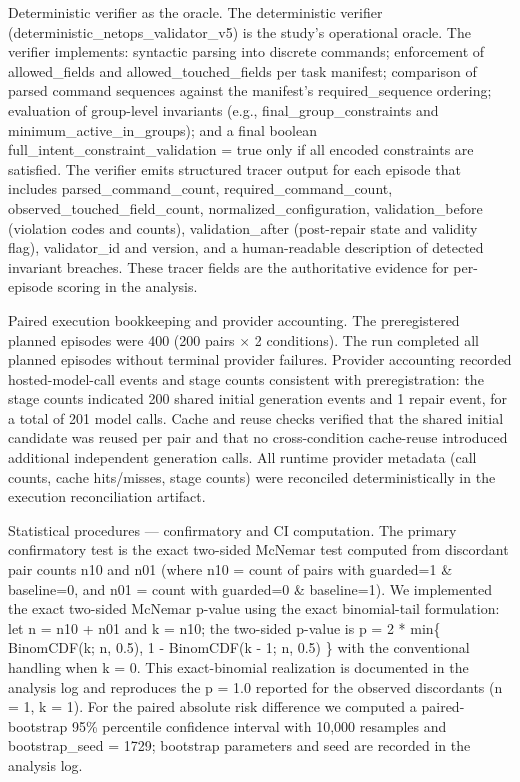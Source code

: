\documentclass[conference]{IEEEtran}
\begin{document}
Deterministic verifier as the oracle. The deterministic verifier (deterministic\_netops\_validator\_v5) is the study's operational oracle. The verifier implements: syntactic parsing into discrete commands; enforcement of allowed\_fields and allowed\_touched\_fields per task manifest; comparison of parsed command sequences against the manifest's required\_sequence ordering; evaluation of group-level invariants (e.g., final\_group\_constraints and minimum\_active\_in\_groups); and a final boolean full\_intent\_constraint\_validation = true only if all encoded constraints are satisfied. The verifier emits structured tracer output for each episode that includes parsed\_command\_count, required\_command\_count, observed\_touched\_field\_count, normalized\_configuration, validation\_before (violation codes and counts), validation\_after (post-repair state and validity flag), validator\_id and version, and a human-readable description of detected invariant breaches. These tracer fields are the authoritative evidence for per-episode scoring in the analysis.

Paired execution bookkeeping and provider accounting. The preregistered planned episodes were 400 (200 pairs \ensuremath{\times} 2 conditions). The run completed all planned episodes without terminal provider failures. Provider accounting recorded hosted-model-call events and stage counts consistent with preregistration: the stage counts indicated 200 shared initial generation events and 1 repair event, for a total of 201 model calls. Cache and reuse checks verified that the shared initial candidate was reused per pair and that no cross-condition cache-reuse introduced additional independent generation calls. All runtime provider metadata (call counts, cache hits/misses, stage counts) were reconciled deterministically in the execution reconciliation artifact.

Statistical procedures --- confirmatory and CI computation. The primary confirmatory test is the exact two-sided McNemar test computed from discordant pair counts n10 and n01 (where n10 = count of pairs with guarded=1 \& baseline=0, and n01 = count with guarded=0 \& baseline=1). We implemented the exact two-sided McNemar p-value using the exact binomial-tail formulation: let n = n10 + n01 and k = n10; the two-sided p-value is p = 2 * min\{ BinomCDF(k; n, 0.5), 1 - BinomCDF(k - 1; n, 0.5) \} with the conventional handling when k = 0. This exact-binomial realization is documented in the analysis log and reproduces the p = 1.0 reported for the observed discordants (n = 1, k = 1). For the paired absolute risk difference we computed a paired-bootstrap 95\% percentile confidence interval with 10,000 resamples and bootstrap\_seed = 1729; bootstrap parameters and seed are recorded in the analysis log.
\end{document}
